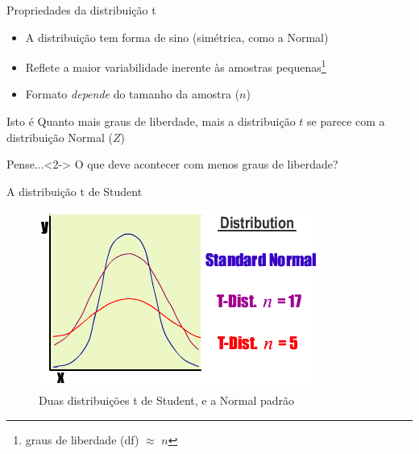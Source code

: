 \documentclass{beamer}
\begin{document}
\begin{frame}{\scriptsize Propriedades da distribuição t}
  \begin{itemize}
    \footnotesize
  \item A distribuição tem forma de sino {\footnotesize(simétrica, como a Normal)}
  \item Reflete a maior variabilidade \alert{inerente} às amostras pequenas\footnote{graus de liberdade (df) $\approx$ $n$}
  \item Formato {\em depende} do tamanho da amostra ($n$) %
  \end{itemize}
  \begin{block}{Isto é}
    \footnotesize
    Quanto mais graus de liberdade, mais a distribuição $t$ se parece com a distribuição Normal ($Z$)
  \end{block}
  \begin{block}{Pense...}<2->
    \footnotesize
    O que deve acontecer com \alert{menos} graus de liberdade?
  \end{block}
\end{frame}

\begin{frame}{\scriptsize A distribuição t de Student}
  \begin{figure}
    \includegraphics[height=0.7\textheight]{Cap7/t_graph}
    \caption{\footnotesize Duas distribuições t de Student, e a Normal padrão}
  \end{figure}
\end{frame}

\end{document}
